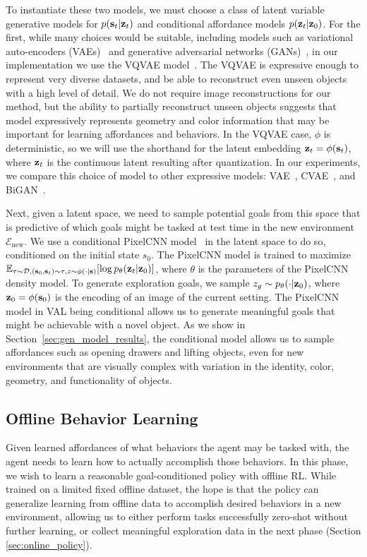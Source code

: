 \documentclass[letterpaper, 10 pt, conference]{ieeeconf}  %
\begin{document}
To instantiate these two models, we must choose a class of latent variable generative models for $p(\mathbf{s}_t | \mathbf{z}_t)$ and conditional affordance models $p(\mathbf{z}_t | \mathbf{z}_0)$. For the first, while many choices would be suitable, including models such as variational auto-encoders (VAEs)~\cite{kingma2014vae} and generative adversarial networks (GANs)~\cite{goodfellow2014gan, donahue2017bigan}, in our implementation we use the VQVAE model~\cite{oord2017vqvae}. The VQVAE is expressive enough to represent very diverse datasets, and be able to reconstruct even unseen objects with a high level of detail. We do not require image reconstructions for our method, but the ability to partially reconstruct unseen objects suggests that model expressively represents geometry and color information that may be important for learning affordances and behaviors. In the VQVAE case, $\phi$ is deterministic, so we will use the shorthand for the latent embedding $\mathbf{z}_t = \phi(\mathbf{s}_t)$, where $\mathbf{z}_t$ is the continuous latent resulting after quantization. In our experiments, we compare this choice of model to other expressive models: VAE~\cite{kingma2014vae}, CVAE~\cite{sohn2015cvae}, and BiGAN~\cite{donahue2017bigan}.

Next, given a latent space, we need to sample potential goals from this space that is predictive of which goals might be tasked at test time in the new environment $\mathcal{E}_\text{new}$. We use a conditional PixelCNN model~\cite{oord2016pixelcnn} in the latent space to do so, conditioned on the initial state $s_0$. The PixelCNN model is trained to maximize $\mathbb{E}_{\tau \sim \mathcal{D}, (\mathbf{s}_0, \mathbf{s}_t) \sim \tau, z \sim \phi(\cdot|\mathbf{s})}[\log p_\theta(\mathbf{z}_t|\mathbf{z}_0)]$, where $\theta$ is the parameters of the PixelCNN density model. To generate exploration goals, we sample $z_g \sim p_\theta(\cdot|\mathbf{z}_0)$, where $\mathbf{z}_0 = \phi(\mathbf{s}_0)$ is the encoding of an image of the current setting. The PixelCNN model in VAL being conditional allows us to generate meaningful goals that might be achievable with a novel object. As we show in Section~\ref{sec:gen_model_results}, the conditional model allows us to sample affordances such as opening drawers and lifting objects, even for new environments that are visually complex with variation in the identity, color, geometry, and functionality of objects.

\subsection{Offline Behavior Learning}
\label{sec:method_behavior_learning}
Given learned affordances of what behaviors the agent may be tasked with, the agent needs to learn how to actually accomplish those behaviors. In this phase, we wish to learn a reasonable goal-conditioned policy with offline RL. While trained on a limited fixed offline dataset, the hope is that the policy can generalize learning from offline data to accomplish desired behaviors in a new environment, allowing us to either perform tasks successfully zero-shot without further learning, or collect meaningful exploration data in the next phase (Section \ref{sec:online_policy}).
\end{document}

